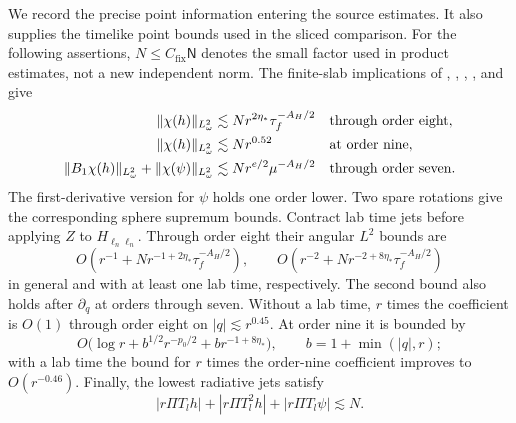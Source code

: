We record the precise point information entering the source estimates.
It also supplies the timelike point bounds used in the sliced comparison.
For the following assertions, $N\le C_{\mathrm{fix}}\mathsf N$ denotes
the small factor used in product estimates, not a new independent norm.
The finite-slab implications of ,
, ,
, and  give
\begin{align}
 \|\chi(h)\|_{L^2_\omega}
   &\lesssim Nr^{2\eta_*}\tau_f^{-A_H/2}
       &&\text{through order eight},\label{far:point-h}\\
 \|\chi(h)\|_{L^2_\omega}
   &\lesssim Nr^{0.52}&&\text{at order nine},\notag\\
 \|B_1\chi(h)\|_{L^2_\omega}+\|\chi(\psi)\|_{L^2_\omega}
   &\lesssim Nr^{e/2}\mu^{-A_H/2}
       &&\text{through order seven}.\label{far:point-first}
\end{align}
The first-derivative version for $\psi$ holds one order lower.  Two spare
rotations give the corresponding sphere supremum bounds.  Contract lab
time jets before applying $Z$ to $H_{\ell_n\ell_n}$.  Through order eight
their angular $L^2$ bounds are
\begin{equation}\label{far:projected-bounds}
 O(r^{-1}+Nr^{-1+2\eta_*}\tau_f^{-A_H/2}),
 \qquad O(r^{-2}+Nr^{-2+8\eta_*}\tau_f^{-A_H/2})
\end{equation}
in general and with at least one lab time, respectively.  The second
bound also holds after $\partial_q$ at orders through seven.  Without a
lab time, $r$ times the coefficient is $O(1)$ through order eight on
$|q|\lesssim r^{0.45}$.  At order nine it is bounded by
\begin{equation}\label{far:top-projected}
 O\bigl(\log r+b^{1/2}r^{-p_0/2}+br^{-1+8\eta_*}\bigr),
 \qquad b=1+\min(|q|,r);
\end{equation}
with a lab time the bound for $r$ times the order-nine coefficient
improves to $O(r^{-0.46})$.  Finally, the lowest radiative jets satisfy
\begin{equation}\label{far:news}
 |r\Pi T_lh|+|r\Pi T_l^2h|+|r\Pi T_l\psi|\lesssim N.
\end{equation}

